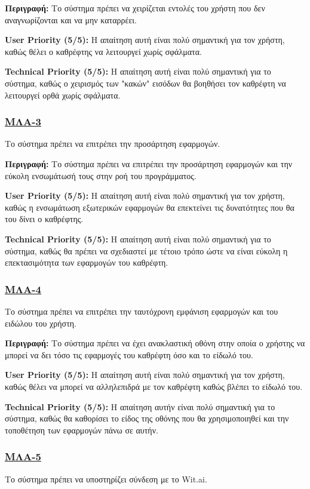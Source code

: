 \noindent\textbf{Περιγραφή:} Το σύστημα πρέπει να χειρίζεται εντολές του χρήστη που δεν αναγνωρίζονται και να μην καταρρέει.

\noindent\textbf{User Priority (5/5):} Η απαίτηση αυτή είναι πολύ σημαντική για τον χρήστη, καθώς θέλει ο καθρέφτης να λειτουργεί χωρίς σφάλματα.

\noindent\textbf{Technical Priority (5/5):} Η απαίτηση αυτή είναι πολύ σημαντική για το σύστημα, καθώς ο χειρισμός των "κακών" εισόδων θα βοηθήσει τον καθρέφτη να λειτουργεί ορθά χωρίς σφάλματα.

\subsubsection{\underline{ΜΛΑ-3}}
\noindent Το σύστημα πρέπει να επιτρέπει την προσάρτηση εφαρμογών.

\noindent\textbf{Περιγραφή:} Το σύστημα πρέπει να επιτρέπει την προσάρτηση εφαρμογών και την εύκολη ενσωμάτωσή τους στην ροή του προγράμματος.

\noindent\textbf{User Priority (5/5):} Η απαίτηση αυτή είναι πολύ σημαντική για τον χρήστη, καθώς η ενσωμάτωση εξωτερικών εφαρμογών θα επεκτείνει τις δυνατότητες που θα του δίνει ο καθρέφτης.

\noindent\textbf{Technical Priority (5/5):} Η απαίτηση αυτή είναι πολύ σημαντική για το σύστημα, καθώς θα πρέπει να σχεδιαστεί με τέτοιο τρόπο ώστε να είναι εύκολη η επεκτασιμότητα των εφαρμογών του καθρέφτη.

\subsubsection{\underline{ΜΛΑ-4}}
\noindent Το σύστημα πρέπει να επιτρέπει την ταυτόχρονη εμφάνιση εφαρμογών και του ειδώλου του χρήστη.

\noindent\textbf{Περιγραφή:} Το σύστημα πρέπει να έχει ανακλαστική οθόνη στην οποία ο χρήστης να μπορεί να δει τόσο τις εφαρμογές του καθρέφτη όσο και το είδωλό του.

\noindent\textbf{User Priority (5/5):} Η απαίτηση αυτή είναι πολύ σημαντική για τον χρήστη, καθώς θέλει να μπορεί να αλληλεπιδρά με τον καθρέφτη καθώς βλέπει το είδωλό του.

\noindent\textbf{Technical Priority (5/5):} Η απαίτηση αυτήν είναι πολύ σημαντική για το σύστημα, καθώς θα καθορίσει το είδος της οθόνης που θα χρησιμοποιηθεί και την τοποθέτηση των εφαρμογών πάνω σε αυτήν.

\subsubsection{\underline{ΜΛΑ-5}}
\noindent Το σύστημα πρέπει να υποστηρίζει σύνδεση με το Wit.ai.

